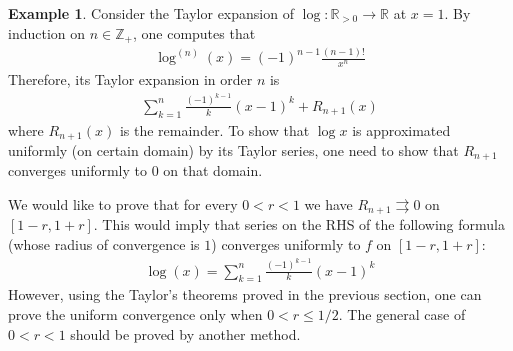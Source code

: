 \documentclass[12pt,b5paper,notitlepage]{article}
\theoremstyle{definition}
\newtheorem{eg}[df]{Example}
\theoremstyle{plain}
\newcommand{\Zbb}{\mathbb Z}
\newcommand{\Rbb}{\mathbb R}
\numberwithin{equation}{section}
\begin{document}
\begin{eg}\label{lb480}
Consider the Taylor expansion of $\log:\Rbb_{>0}\rightarrow\Rbb$ at $x=1$. By induction on $n\in\Zbb_+$, one computes that
\begin{align*}
\log^{(n)}(x)=(-1)^{n-1}\frac{(n-1)!}{x^n}
\end{align*}
Therefore, its Taylor expansion in order $n$ is
\begin{align*}
\sum_{k=1}^n \frac{(-1)^{k-1}}{k} (x-1)^k+R_{n+1}(x)
\end{align*}
where $R_{n+1}(x)$ is the remainder. To show that $\log x$ is approximated uniformly (on certain domain) by its Taylor series, one need to show that $R_{n+1}$ converges uniformly to $0$ on that domain. 

We would like to prove that for every $0<r<1$ we have $R_{n+1}\rightrightarrows 0$ on $[1-r,1+r]$. This would imply that series on the RHS of the following formula (whose radius of convergence is $1$) converges uniformly to $f$ on $[1-r,1+r]$:
\begin{align}
\log(x)=\sum_{k=1}^n \frac{(-1)^{k-1}}{k} (x-1)^k
\end{align}
However, using the Taylor's theorems proved in the previous section, one can prove the uniform convergence only when $0<r\leq1/2$. The general case of $0<r<1$ should be proved by another method.   \hfill\qedsymbol
\end{eg}
\end{document}
